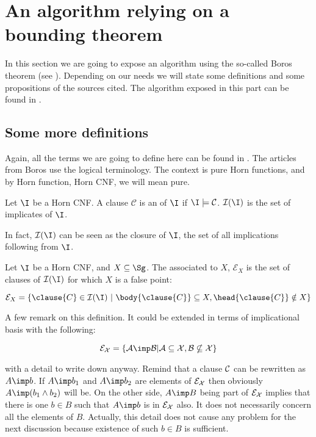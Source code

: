 \section{An algorithm relying on a bounding theorem}

In this section we are going to expose an algorithm using the so-called Boros
theorem (see \cite{berczi_directed_2017, boros_strong_2017, 
boros_exclusive_2010}). Depending on our needs we will state some definitions 
and some propositions of the sources cited. The algorithm exposed in this part
can be found in \cite{berczi_directed_2017}.

\subsection{Some more definitions}

Again, all the terms we are going to define here can be found in 
\cite{berczi_directed_2017, boros_strong_2017, boros_exclusive_2010}. The 
articles from Boros use the logical terminology. The context is pure Horn 
functions, and by Horn function, Horn CNF, we will mean pure.

\begin{definition} Let $\I$ be a Horn CNF. A clause 
$\mathcal{C}$ is an  of $\I$ if $\I \models \mathcal{C}$.
$\mathcal{I}(\I)$ is the set of implicates of $\I$.
\end{definition}

In fact, $\mathcal{I}(\I)$ can be seen as the closure of $\I$, the set of all
implications following from $\I$.

\begin{definition} Let $\I$ be a Horn CNF, and $X 
\subseteq \Sg$. The  associated to $X$, $\mathcal{E}_X$
is the set of clauses of $\mathcal{I}(\I)$ for which $X$ is a false point:

	\[ \mathcal{E}_X = \{ \clause{C} \in \mathcal{I}(\I) \ | 
		\ \body{\clause{C}} \subseteq X, \head{\clause{C}} \notin X \} \] 
\end{definition}

A few remark on this definition. It could be extended in terms of implicational
basis with the following:

	\[ \cal{E}_X = \{ A \imp B | A \subseteq X, B \nsubseteq X \} \]

\noindent with a detail to write down anyway. Remind that a clause $\cal{C}$ 
can be rewritten as $A \imp b$. If $A \imp b_1$ and $A \imp b_2$ are elements 
of $\cal{E}_X$ then obviously $A \imp (b_1 \land b_2)$ will be. On the other 
side, $A \imp B$ being part of $\cal{E}_X$ implies that there is  one $b \in B$ such that $A \imp b$ is in $\cal{E}_X$ also. It does not 
necessarily concern all the elements of $B$. Actually, this detail does not 
cause any problem for the next discussion because existence of such $b \in B$ 
is sufficient. 

